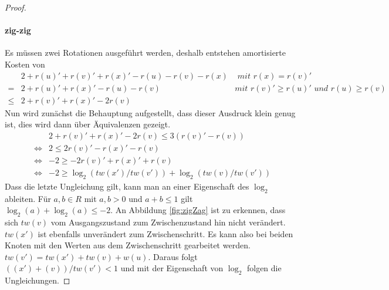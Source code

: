 \documentclass[a4paper,12pt]{article}
\begin{document}
\begin{proof}
	\paragraph{zig-zig} 
	Es müssen zwei Rotationen ausgeführt werden, deshalb entstehen amortisierte Kosten von
	\begin{align*}
	&2 + r\left(u\right)' +r\left(v\right)' +r\left(x\right)' - r\left(u\right)- r\left(v\right)- r\left(x\right) &\textit{ mit $r\left(x\right) =  r\left(v\right)'$ }\\
	=& 2 + r\left(u\right)' +r\left(x\right)' - r\left(u\right)- r\left(v\right) &\textit{mit
		$r\left(v\right)' \geq  r\left(u\right)'$ und $r\left(u\right) \geq  r\left(v\right)$}\\
	\leq &  2 + r\left(v\right)' + r\left(x\right)' - 2 r\left(v\right) 
	\end{align*}
	Nun wird zunächst die Behauptung aufgestellt, dass dieser Ausdruck klein genug ist, dies wird dann über Äquivalenzen gezeigt.
	\begin{align*}
	& 2 + r\left(v\right)' + r\left(x\right)' - 2 r\left(v\right) \leq  3\left(r\left(v\right)'- r\left(v\right)\right)\\
	\Leftrightarrow &2 \leq 2r\left(v\right)' -  r\left(x\right)' - r\left(v\right)\\
	\Leftrightarrow & -2 \geq -2r\left(v\right)' +  r\left(x\right)' + r\left(v\right)\\
	\Leftrightarrow & -2 \geq \log_2\left(\mathit{tw}\left(x'\right) / \mathit{tw}\left(v'\right)\right) + \log_2\left(\mathit{tw}\left(v\right) / \mathit{tw}\left(v'\right)\right)
	\end{align*}
	Dass die letzte Ungleichung gilt, kann man an einer Eigenschaft des $\log_2$ ableiten. Für $a,b \in \mathit{R}$ mit $a,b > 0$ und $a + b \leq 1$ gilt $\log_2\left(a\right) + \log_2\left(a\right) \leq -2$. An Abbildung \ref{fig:zigZag} ist zu erkennen, dass sich $\mathit{tw}\left(v\right)$ vom Ausgangszustand zum Zwischenzustand hin nicht verändert. $\mathit{tw}\left(x'\right)$ ist ebenfalls unverändert zum Zwischenschritt. Es kann also bei beiden Knoten mit den Werten aus dem Zwischenschritt gearbeitet werden.  $\mathit{tw}\left(v'\right) = \mathit{tw}\left(x'\right) + \mathit{tw}\left(v\right) + w\left(u\right) $. Daraus folgt $\left(\left(x'\right) + \left(v\right)\right) /  \mathit{tw}\left(v'\right) < 1$ und mit der Eigenschaft von $\log_2$ folgen die Ungleichungen.
	

\end{proof}
\end{document}
